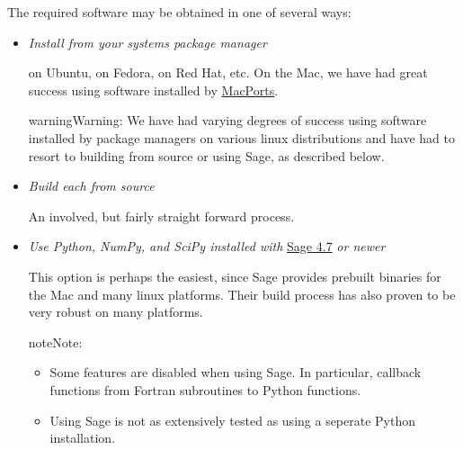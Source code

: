 \documentclass[letterpaper,10pt,english]{sphinxmanual}
\begin{document}
The required software may be obtained in one of several ways:
\begin{itemize}
\item {} 
\emph{Install from your systems package manager}

 on Ubuntu,  on Fedora,  on Red Hat, etc. On the
Mac, we have had great success using software installed by \href{http://www.macports.org}{MacPorts}.

\begin{notice}{warning}{Warning:}
We have had varying degrees of success using software installed by
package managers on various linux distributions and have had to resort
to building from source or using Sage, as described below.
\end{notice}

\item {} 
\emph{Build each from source}

An involved, but fairly straight forward process.

\item {} 
\emph{Use Python, NumPy, and SciPy installed with}
\href{http://www.sagemath.org/}{Sage 4.7} \emph{or newer}

This option is perhaps the easiest, since Sage provides prebuilt binaries
for the Mac and many linux platforms. Their build process has also proven
to be very robust on many platforms.

\begin{notice}{note}{Note:}\begin{itemize}
\item {} 
Some features are disabled when using Sage. In particular, callback
functions from Fortran subroutines to Python functions.

\item {} 
Using Sage is not as extensively tested as using a seperate Python
installation.

\end{itemize}
\end{notice}

\end{itemize}
\end{document}
